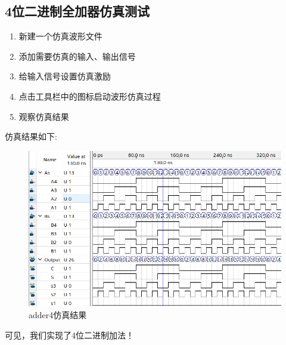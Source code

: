 \documentclass{article}
\begin{document}
\subsection{4位二进制全加器仿真测试}

\begin{enumerate}
\item 新建一个仿真波形文件
\item 添加需要仿真的输入、输出信号
\item 给输入信号设置仿真激励
\item 点击工具栏中的图标启动波形仿真过程
\item 观察仿真结果
\end{enumerate}

仿真结果如下:
\begin{figure}[H]
\centering
\includegraphics[width=\textwidth]{sum_output}
\caption{adder4仿真结果}
\end{figure}
可见，我们实现了4位二进制加法！
\end{document}
